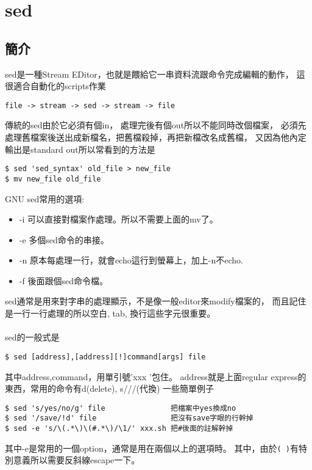\chapter{sed}
    \section{簡介}
    sed是一種Stream EDitor，也就是餵給它一串資料流跟命令完成編輯的動作，
    這很適合自動化的scripts作業
    \begin{verbatim}
file -> stream -> sed -> stream -> file
    \end{verbatim}
    傳統的sed由於它必須有個in， 處理完後有個out所以不能同時改個檔案，
    必須先處理舊檔案後送出成新檔名，把舊檔殺掉，再把新檔改名成舊檔，
    又因為他內定輸出是standard out所以常看到的方法是
    \begin{verbatim}
$ sed 'sed_syntax' old_file > new_file
$ mv new_file old_file
    \end{verbatim}

    GNU sed常用的選項:
    \begin{itemize}
    \item -i 可以直接對檔案作處理。所以不需要上面的mv了。
    \item -e 多個sed命令的串接。
    \item -n 原本每處理一行，就會echo這行到螢幕上，加上-n不echo.
    \item -f 後面跟個sed命令檔。
    \end{itemize}
    sed通常是用來對字串的處理顯示，不是像一般editor來modify檔案的，
    而且記住是一行一行處理的所以空白, tab, 換行這些字元很重要。
    \\\\
    sed的一般式是
    \begin{verbatim}
$ sed [address],[address][!]command[args] file
    \end{verbatim}
    其中address,command，用單引號'xxx '包住。
    address就是上面regular express的東西，常用的命令有d(delete), s///(代換)
    一些簡單例子
    \begin{verbatim}
$ sed 's/yes/no/g' file               把檔案中yes換成no
$ sed '/save/!d' file                 把沒有save字眼的行幹掉
$ sed -e 's/\(.*\)\(#.*\)/\1/' xxx.sh 把#後面的註解幹掉
    \end{verbatim}
    其中-e是常用的一個option，通常是用在兩個以上的選項時。
    其中，由於\verb=( )=有特別意義所以需要反斜線escape一下。

